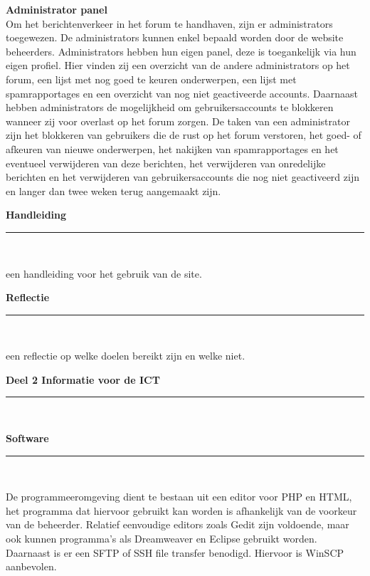 \documentclass[a4paper,12pt]{article}
\newcommand{\HRule}{\rule{\linewidth}{0.5mm}}
\begin{document}
{\bfseries Administrator panel}\\
Om het berichtenverkeer in het forum te handhaven, zijn er administrators toegewezen. De administrators kunnen enkel bepaald worden door de website beheerders. Administrators hebben hun eigen panel, deze is toegankelijk via hun eigen profiel. Hier vinden zij een overzicht van de andere administrators op het forum, een lijst met nog goed te keuren onderwerpen, een lijst met spamrapportages en een overzicht van nog niet geactiveerde accounts. Daarnaast hebben administrators de mogelijkheid om gebruikersaccounts te blokkeren wanneer zij voor overlast op het forum zorgen. De taken van een administrator zijn het blokkeren van gebruikers die de rust op het forum verstoren, het goed- of afkeuren van nieuwe onderwerpen, het nakijken van spamrapportages en het eventueel verwijderen van deze berichten, het verwijderen van onredelijke berichten en het verwijderen van gebruikersaccounts die nog niet geactiveerd zijn en langer dan twee weken terug aangemaakt zijn.



\newpage
\begin{center}
{ \LARGE \bfseries Handleiding}\\[0.1cm]
\HRule \\[0.5cm]
\end{center}
een handleiding voor het gebruik van de site.


\newpage
\begin{center}
{ \LARGE \bfseries Reflectie}\\[0.1cm]
\HRule \\[0.5cm]
\end{center}
een reflectie op welke doelen bereikt zijn en welke niet.


\newpage
\begin{center}
{\LARGE \bfseries Deel 2 Informatie voor de ICT}\\[0.1cm]
\HRule \\[0.5cm]
\end{center}


\newpage
\begin{center}
{\LARGE \bfseries Software}\\[0.1cm]
\HRule \\[0.5cm]
\end{center}
De programmeeromgeving dient te bestaan uit een editor voor PHP en HTML, het programma dat hiervoor gebruikt kan worden is afhankelijk van de voorkeur van de beheerder. Relatief eenvoudige editors zoals Gedit zijn voldoende, maar ook kunnen programma's als Dreamweaver en Eclipse gebruikt worden. Daarnaast is er een SFTP of SSH file transfer benodigd. Hiervoor is WinSCP aanbevolen.
\end{document}
